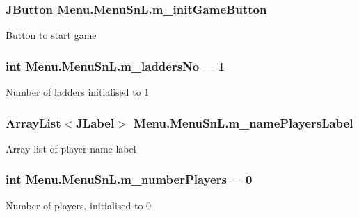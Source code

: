 \subsubsection[{m\+\_\+init\+Game\+Button}]{\setlength{\rightskip}{0pt plus 5cm}J\+Button Menu.\+Menu\+Sn\+L.\+m\+\_\+init\+Game\+Button\hspace{0.3cm}{\ttfamily [private]}}\label{class_menu_1_1_menu_sn_l_ac45af15bf2aabd1916063700e1e44f08}
Button to start game \hypertarget{class_menu_1_1_menu_sn_l_a30c87e65118ddf61c75fa3d9d9abe36e}{}
\subsubsection[{m\+\_\+ladders\+No}]{\setlength{\rightskip}{0pt plus 5cm}int Menu.\+Menu\+Sn\+L.\+m\+\_\+ladders\+No = 1\hspace{0.3cm}{\ttfamily [private]}}\label{class_menu_1_1_menu_sn_l_a30c87e65118ddf61c75fa3d9d9abe36e}
Number of ladders initialised to 1 \hypertarget{class_menu_1_1_menu_sn_l_ab29efffc6315a328efb34fed209c0677}{}
\subsubsection[{m\+\_\+name\+Players\+Label}]{\setlength{\rightskip}{0pt plus 5cm}Array\+List$<$J\+Label$>$ Menu.\+Menu\+Sn\+L.\+m\+\_\+name\+Players\+Label\hspace{0.3cm}{\ttfamily [private]}}\label{class_menu_1_1_menu_sn_l_ab29efffc6315a328efb34fed209c0677}
Array list of player name label \hypertarget{class_menu_1_1_menu_sn_l_afee3307aa062adfbee4edd14484c8f2c}{}
\subsubsection[{m\+\_\+number\+Players}]{\setlength{\rightskip}{0pt plus 5cm}int Menu.\+Menu\+Sn\+L.\+m\+\_\+number\+Players = 0\hspace{0.3cm}{\ttfamily [private]}}\label{class_menu_1_1_menu_sn_l_afee3307aa062adfbee4edd14484c8f2c}
Number of players, initialised to 0 \hypertarget{class_menu_1_1_menu_sn_l_a75cae58abbeef1dc893ab2214f84aaad}{}
